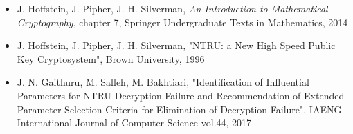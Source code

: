 \documentclass[12pt]{article}
\theoremstyle{definition}
\theoremstyle{proposition}
\theoremstyle{remark}
\theoremstyle{theorem}
\theoremstyle{example}
\begin{document}
\begin{itemize}
    \item J. Hoffstein, J. Pipher, J. H. Silverman,  \textit{An Introduction to Mathematical Cryptography}, chapter 7, Springer Undergraduate Texts in Mathematics, 2014

    \item J. Hoffstein, J. Pipher, J. H. Silverman, "NTRU: a  New High Speed Public Key Cryptosystem", Brown University, 1996
    
    \item J. N. Gaithuru, M. Salleh, M. Bakhtiari, "Identification of Influential Parameters for NTRU Decryption Failure and Recommendation of Extended Parameter Selection Criteria for Elimination of Decryption Failure", IAENG International Journal of Computer Science vol.44, 2017
\end{itemize}
\end{document}
